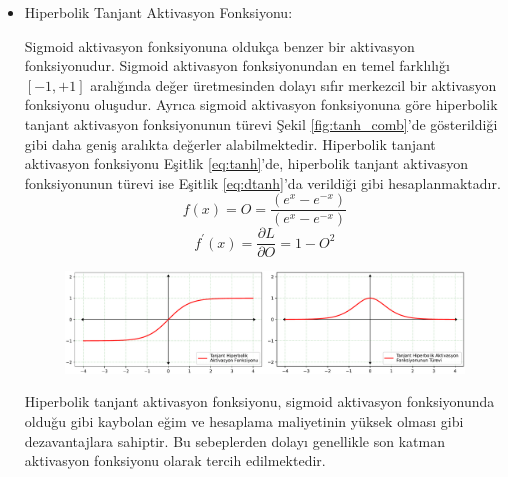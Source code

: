 \begin{itemize}
    \item Hiperbolik Tanjant Aktivasyon Fonksiyonu:
    
    Sigmoid aktivasyon fonksiyonuna oldukça benzer bir aktivasyon fonksiyonudur. Sigmoid aktivasyon fonksiyonundan en temel farklılığı $[-1,+1]$ aralığında değer üretmesinden dolayı sıfır merkezcil bir aktivasyon fonksiyonu oluşudur. Ayrıca sigmoid aktivasyon fonksiyonuna göre hiperbolik tanjant aktivasyon fonksiyonunun türevi Şekil \ref{fig:tanh_comb}'de gösterildiği gibi daha geniş aralıkta değerler alabilmektedir. Hiperbolik tanjant aktivasyon fonksiyonu Eşitlik \ref{eq:tanh}'de, hiperbolik tanjant aktivasyon fonksiyonunun türevi ise  Eşitlik \ref{eq:dtanh}'da verildiği gibi hesaplanmaktadır.
    {\setlength{\mathindent}{0cm}
    \begin{equation}
    	\label{eq:tanh}
    	f(x)=O=\frac{(e^{x} - e^{-x})}{(e^{x} - e^{-x})}
    \end{equation}
    \vspace{-1cm}
    \begin{equation}
    	\label{eq:dtanh}
    	f^{\prime}(x)= \frac{\partial L}{\partial  O} =1-O^{2}
    \end{equation}}    
    \begin{figure}[h!]
    	\begin{center}
    		\vspace{-0.6cm}
    		{
    			\vspace{0.4cm}
    			\includegraphics[scale=0.45]{Yapilan-Calismalar/Figures/tanh_comb.pdf}
    		}
    	\end{center}
    \end{figure}  
    
    \vspace{-0.6cm}
    Hiperbolik tanjant aktivasyon fonksiyonu, sigmoid aktivasyon fonksiyonunda olduğu gibi kaybolan eğim ve hesaplama maliyetinin yüksek olması gibi dezavantajlara sahiptir. Bu sebeplerden dolayı genellikle son katman aktivasyon fonksiyonu olarak tercih edilmektedir.
    

\end{itemize}
